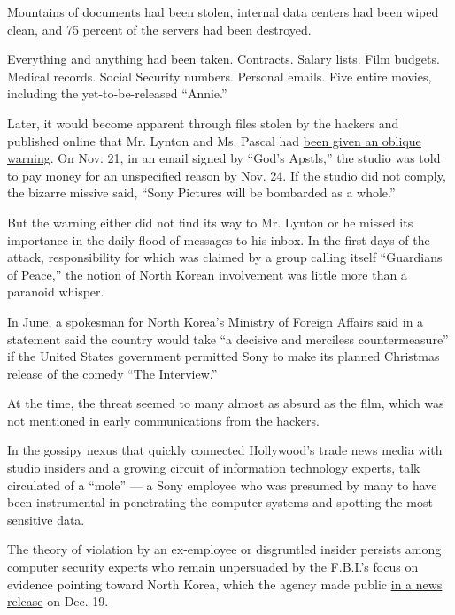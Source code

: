 Mountains of documents had been stolen, internal data centers had been
wiped clean, and 75 percent of the servers had been destroyed.

Everything and anything had been taken. Contracts. Salary lists. Film
budgets. Medical records. Social Security numbers. Personal emails. Five
entire movies, including the yet-to-be-released ``Annie.''

Later, it would become apparent through files stolen by the hackers and
published online that Mr. Lynton and Ms. Pascal had
\href{http://www.wired.com/2014/12/sony-hack-part-deux/}{been given an
oblique warning}. On Nov. 21, in an email signed by ``God's Apstls,''
the studio was told to pay money for an unspecified reason by Nov. 24.
If the studio did not comply, the bizarre missive said, ``Sony Pictures
will be bombarded as a whole.''

But the warning either did not find its way to Mr. Lynton or he missed
its importance in the daily flood of messages to his inbox. In the first
days of the attack, responsibility for which was claimed by a group
calling itself ``Guardians of Peace,'' the notion of North Korean
involvement was little more than a paranoid whisper.

In June, a spokesman for North Korea's Ministry of Foreign Affairs said
in a statement said the country would take ``a decisive and merciless
countermeasure'' if the United States government permitted Sony to make
its planned Christmas release of the comedy ``The Interview.''

At the time, the threat seemed to many almost as absurd as the film,
which was not mentioned in early communications from the hackers.

In the gossipy nexus that quickly connected Hollywood's trade news media
with studio insiders and a growing circuit of information technology
experts, talk circulated of a ``mole'' --- a Sony employee who was
presumed by many to have been instrumental in penetrating the computer
systems and spotting the most sensitive data.

The theory of violation by an ex-employee or disgruntled insider
persists among computer security experts who remain unpersuaded by
\href{http://www.politico.com/story/2014/12/fbi-briefed-on-alternate-sony-hack-theory-113866.html}{the
F.B.I.'s focus} on evidence pointing toward North Korea, which the
agency made public
\href{http://www.nytimes.com/aponline/2014/12/19/arts/ap-us-sony-hack.html}{in
a news release} on Dec. 19.

